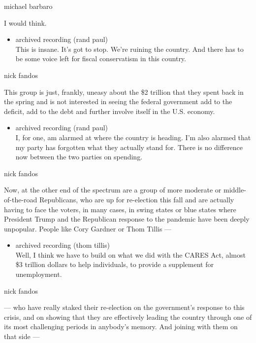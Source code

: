 michael barbaro

I would think.

\begin{itemize}
\tightlist
\item
  archived recording (rand paul)\\
  This is insane. It's got to stop. We're ruining the country. And there
  has to be some voice left for fiscal conservatism in this country.
\end{itemize}

nick fandos

This group is just, frankly, uneasy about the \$2 trillion that they
spent back in the spring and is not interested in seeing the federal
government add to the deficit, add to the debt and further involve
itself in the U.S. economy.

\begin{itemize}
\tightlist
\item
  archived recording (rand paul)\\
  I, for one, am alarmed at where the country is heading. I'm also
  alarmed that my party has forgotten what they actually stand for.
  There is no difference now between the two parties on spending.
\end{itemize}

nick fandos

Now, at the other end of the spectrum are a group of more moderate or
middle-of-the-road Republicans, who are up for re-election this fall and
are actually having to face the voters, in many cases, in swing states
or blue states where President Trump and the Republican response to the
pandemic have been deeply unpopular. People like Cory Gardner or Thom
Tillis ---

\begin{itemize}
\tightlist
\item
  archived recording (thom tillis)\\
  Well, I think we have to build on what we did with the CARES Act,
  almost \$3 trillion dollars to help individuals, to provide a
  supplement for unemployment.
\end{itemize}

nick fandos

--- who have really staked their re-election on the government's
response to this crisis, and on showing that they are effectively
leading the country through one of its most challenging periods in
anybody's memory. And joining with them on that side ---

